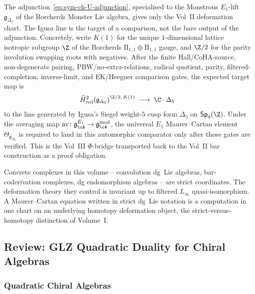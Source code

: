\begin{remark}
\label{rem:bar-cobar-1-igusa-gauge}
The adjunction~\eqref{eq:sym-ch-U-adjunction}, specialised to the
Monstrous $E_1$-lift~$\mathfrak{g}_{\Delta_5}$ of the Borcherds
Monster Lie algebra, gives only the Vol~II deformation chart.
The Igusa line is the target of a comparison, not the bare output of
the adjunction. Concretely, write $K(1)$ for the unique
$1$-dimensional lattice isotropic subgroup $\Z$ of the Borcherds
$\mathrm{II}_{1,1}\oplus \mathrm{II}_{1,1}$ gauge, and $\Z/2$ for the
parity involution swapping roots with negatives. After the finite
Hall/CoHA-source, non-degenerate pairing, PBW/no-extra-relations,
radical quotient, parity, filtered-completion, inverse-limit, and
EK/Heegner comparison gates, the expected target map is
\[
\widehat H^2_{\mathrm{red}}\!
  \left(\mathfrak{g}_{\Delta_5}\right)^{\Z/2,\,K(1)}
\;\longrightarrow\;
\C\cdot\Delta_5
\]
to the line generated by Igusa's Siegel weight-$5$ cusp form
$\Delta_5$ on $\mathsf{Sp}_4(\Z)$. Under the averaging map
$\mathrm{av}\colon \mathfrak{g}^{E_1}_\cA \to
\mathfrak{g}^{\mathrm{mod}}_\cA$, the universal $E_1$
Maurer--Cartan element
$\Theta_{\mathfrak{g}_{\Delta_5}}$ is required to land in this
automorphic comparator only after those gates are verified. This is
the Vol~III $\Phi$-bridge transported back to the Vol~II bar
construction as a proof obligation.
\end{remark}

\begin{convention}
\label{conv:vol2-strict-models}
Concrete complexes in this volume -- convolution dg~Lie algebras,
bar-coderivation complexes, dg endomorphism algebras -- are strict
coordinates. The deformation theory they control is invariant up to
filtered $L_\infty$ quasi-isomorphism. A Maurer--Cartan equation
written in strict dg~Lie notation is a computation in one chart on
an underlying homotopy deformation object, the strict-versus-homotopy
distinction of Volume~I.
\end{convention}

\subsection{Review: GLZ Quadratic Duality for Chiral Algebras}

\subsubsection{Quadratic Chiral Algebras}

